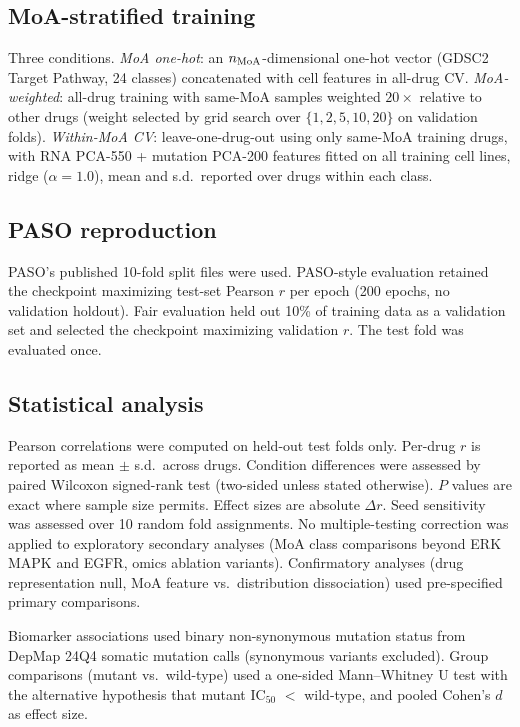 \subsection*{MoA-stratified training}

Three conditions. \textit{MoA one-hot}: an $n_{\rm MoA}$-dimensional one-hot vector (GDSC2 Target Pathway, 24 classes) concatenated with cell features in all-drug CV. \textit{MoA-weighted}: all-drug training with same-MoA samples weighted $20\times$ relative to other drugs (weight selected by grid search over $\{1, 2, 5, 10, 20\}$ on validation folds). \textit{Within-MoA CV}: leave-one-drug-out using only same-MoA training drugs, with RNA PCA-550 + mutation PCA-200 features fitted on all training cell lines, ridge ($\alpha = 1.0$), mean and s.d.\ reported over drugs within each class.

\subsection*{PASO reproduction}

PASO's published 10-fold split files were used. PASO-style evaluation retained the checkpoint maximizing test-set Pearson $r$ per epoch (200 epochs, no validation holdout). Fair evaluation held out 10\% of training data as a validation set and selected the checkpoint maximizing validation $r$. The test fold was evaluated once.

\subsection*{Statistical analysis}

Pearson correlations were computed on held-out test folds only. Per-drug $r$ is reported as mean $\pm$ s.d.\ across drugs. Condition differences were assessed by paired Wilcoxon signed-rank test (two-sided unless stated otherwise). $P$ values are exact where sample size permits. Effect sizes are absolute $\Delta r$. Seed sensitivity was assessed over 10 random fold assignments. No multiple-testing correction was applied to exploratory secondary analyses (MoA class comparisons beyond ERK MAPK and EGFR, omics ablation variants). Confirmatory analyses (drug representation null, MoA feature vs.\ distribution dissociation) used pre-specified primary comparisons.

Biomarker associations used binary non-synonymous mutation status from DepMap 24Q4 somatic mutation calls (synonymous variants excluded). Group comparisons (mutant vs.\ wild-type) used a one-sided Mann--Whitney U test with the alternative hypothesis that mutant IC$_{50}$ $<$ wild-type, and pooled Cohen's $d$ as effect size.

